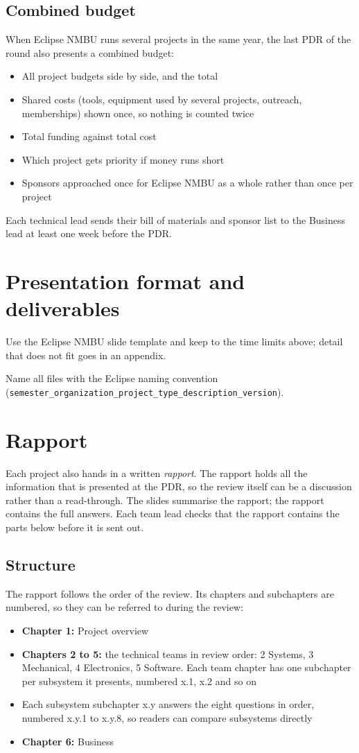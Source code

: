 \documentclass{../../Common/Latex/Templates/rapport}
\renewcommand{\vsection}[1]{\section{#1}}
\renewcommand{\vsubsection}[1]{\subsection{#1}}
\begin{document}
\vsubsection{Combined budget}
When Eclipse NMBU runs several projects in the same year, the last PDR of the round also presents a combined budget:
\begin{itemize}
  \item All project budgets side by side, and the total
  \item Shared costs (tools, equipment used by several projects, outreach, memberships) shown once, so nothing is counted twice
  \item Total funding against total cost
  \item Which project gets priority if money runs short
  \item Sponsors approached once for Eclipse NMBU as a whole rather than once per project
\end{itemize}

Each technical lead sends their bill of materials and sponsor list to the Business lead at least one week before the PDR.

\vsection{Presentation format and deliverables}
Use the Eclipse NMBU slide template and keep to the time limits above; detail that does not fit goes in an appendix.

Name all files with the Eclipse naming convention (\texttt{semester\_organization\_project\_type\_description\_version}).

\vsection{Rapport}
Each project also hands in a written \emph{rapport}. The rapport holds all the information that is presented at the PDR, so the review itself can be a discussion rather than a read-through. The slides summarise the rapport; the rapport contains the full answers. Each team lead checks that the rapport contains the parts below before it is sent out.

\vsubsection{Structure}
The rapport follows the order of the review. Its chapters and subchapters are numbered, so they can be referred to during the review:
\begin{itemize}
  \item \textbf{Chapter 1:} Project overview
  \item \textbf{Chapters 2 to 5:} the technical teams in review order: 2 Systems, 3 Mechanical, 4 Electronics, 5 Software. Each team chapter has one subchapter per subsystem it presents, numbered x.1, x.2 and so on
  \item Each subsystem subchapter x.y answers the eight questions in order, numbered x.y.1 to x.y.8, so readers can compare subsystems directly
  \item \textbf{Chapter 6:} Business
\end{itemize}
\end{document}

